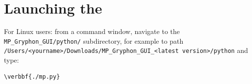 \documentclass[11pt,fleqn]{article} %
\begin{document}
%

\section{Launching the \ggui}
For Linux users: from a command window, navigate to the \verb+MP_Gryphon_GUI/python/+ subdirectory, for example to path\\
\verb+/Users/<yourname>/Downloads/MP_Gryphon_GUI_<latest version>/python+ and type:
\begin{Verbatim}[commandchars=\\\{\}]
\verbbf{./mp.py}
\end{Verbatim}
\end{document}

